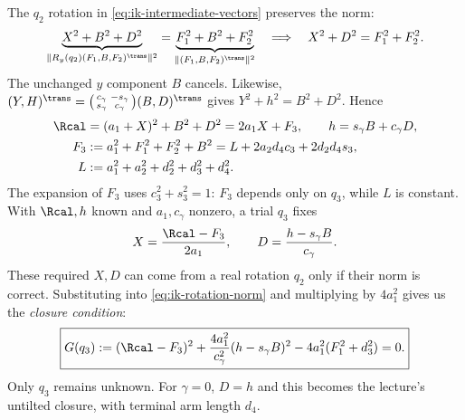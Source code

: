 The $q_2$ rotation in \eqref{eq:ik-intermediate-vectors} preserves the norm:
\begin{equation}
 \underbrace{X^2+B^2+D^2}_{\|R_y(q_2)(F_1,B,F_2)^\trans\|^2}
 =\underbrace{F_1^2+B^2+F_2^2}_{\|(F_1,B,F_2)^\trans\|^2}
 \quad\Longrightarrow\quad X^2+D^2=F_1^2+F_2^2.
 \label{eq:ik-rotation-norm}
\end{equation}
The unchanged $y$ component $B$ cancels. Likewise,
$(Y,H)^\trans=\bigl(\begin{smallmatrix}c_\gamma&-s_\gamma\\s_\gamma&c_\gamma\end{smallmatrix}\bigr)(B,D)^\trans$
gives $Y^2+h^2=B^2+D^2$. Hence
\begin{equation}
 \begin{aligned}
 \Rcal&=(a_1+X)^2+B^2+D^2=2a_1X+F_3,\qquad
 h=s_\gamma B+c_\gamma D,\\
 F_3&:=a_1^2+F_1^2+F_2^2+B^2
     =L+2a_2d_4c_3+2d_2d_4s_3,\\
 L&:=a_1^2+a_2^2+d_2^2+d_3^2+d_4^2.
 \end{aligned}
 \label{eq:ik-invariant-equations}
\end{equation}
The expansion of $F_3$ uses $c_3^2+s_3^2=1$: $F_3$ depends only on $q_3$,
while $L$ is constant. With $\Rcal,h$ known and $a_1,c_\gamma$ nonzero,
a trial $q_3$ fixes
\begin{equation}
 X=\frac{\Rcal-F_3}{2a_1},\qquad
 D=\frac{h-s_\gamma B}{c_\gamma}.
 \label{eq:ik-XD}
\end{equation}
These required $X,D$ can come from a real rotation $q_2$ only if their norm
is correct. Substituting into \eqref{eq:ik-rotation-norm} and multiplying by
$4a_1^2$ gives us the \emph{closure condition}:
\begin{equation}
 \boxed{G(q_3):=(\Rcal-F_3)^2+
       \frac{4a_1^2}{c_\gamma^2}(h-s_\gamma B)^2
       -4a_1^2(F_1^2+d_3^2)=0.}
 \label{eq:ik-closure}
\end{equation}
Only $q_3$ remains unknown. For $\gamma=0$, $D=h$ and this becomes the
lecture's untilted closure, with terminal arm length $d_4$.

